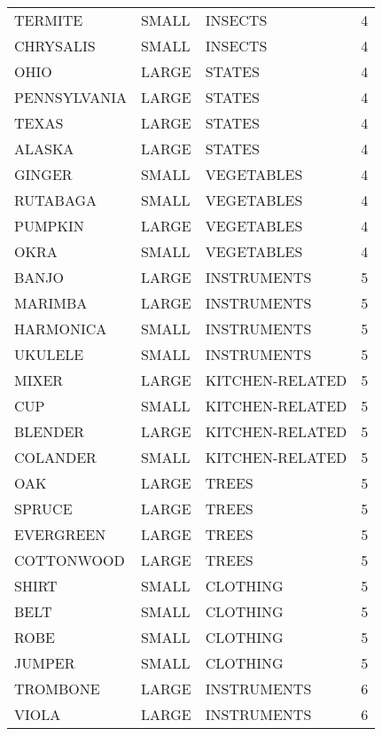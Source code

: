 \begin{tabular}{lllr}
     TERMITE & SMALL &          INSECTS &        4 \\
   CHRYSALIS & SMALL &          INSECTS &        4 \\
        OHIO & LARGE &           STATES &        4 \\
PENNSYLVANIA & LARGE &           STATES &        4 \\
       TEXAS & LARGE &           STATES &        4 \\
      ALASKA & LARGE &           STATES &        4 \\
      GINGER & SMALL &       VEGETABLES &        4 \\
    RUTABAGA & SMALL &       VEGETABLES &        4 \\
     PUMPKIN & LARGE &       VEGETABLES &        4 \\
        OKRA & SMALL &       VEGETABLES &        4 \\
       BANJO & LARGE &      INSTRUMENTS &        5 \\
     MARIMBA & LARGE &      INSTRUMENTS &        5 \\
   HARMONICA & SMALL &      INSTRUMENTS &        5 \\
     UKULELE & SMALL &      INSTRUMENTS &        5 \\
       MIXER & LARGE &  KITCHEN-RELATED &        5 \\
         CUP & SMALL &  KITCHEN-RELATED &        5 \\
     BLENDER & LARGE &  KITCHEN-RELATED &        5 \\
    COLANDER & SMALL &  KITCHEN-RELATED &        5 \\
         OAK & LARGE &            TREES &        5 \\
      SPRUCE & LARGE &            TREES &        5 \\
   EVERGREEN & LARGE &            TREES &        5 \\
  COTTONWOOD & LARGE &            TREES &        5 \\
       SHIRT & SMALL &         CLOTHING &        5 \\
        BELT & SMALL &         CLOTHING &        5 \\
        ROBE & SMALL &         CLOTHING &        5 \\
      JUMPER & SMALL &         CLOTHING &        5 \\
    TROMBONE & LARGE &      INSTRUMENTS &        6 \\
       VIOLA & LARGE &      INSTRUMENTS &        6 \\

\end{tabular}

